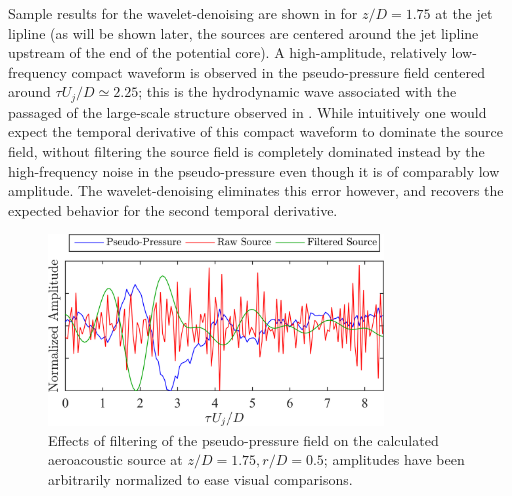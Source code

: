 
Sample results for the wavelet-denoising are shown in  for $z/D=1.75$ at the jet lipline (as will be shown later, the sources are centered around the jet lipline upstream of the end of the potential core).
A high-amplitude, relatively low-frequency compact waveform is observed in the pseudo-pressure field centered around $\tau U_j /D \simeq 2.25$; this is the hydrodynamic wave associated with the passaged of the large-scale structure observed in .
While intuitively one would expect the temporal derivative of this compact waveform to dominate the source field, without filtering the source field is completely dominated instead by the high-frequency noise in the pseudo-pressure even though it is of comparably low amplitude.
The wavelet-denoising eliminates this error however, and recovers the expected behavior for the second temporal derivative.
\begin{figure}
	\centering
	\includegraphics[width = 3.5in]{Figures/ch5_valid_denoising.png}
	\caption{Effects of filtering of the pseudo-pressure field on the calculated aeroacoustic source at $z/D = 1.75, r/D = 0.5$; amplitudes have been arbitrarily normalized to ease visual comparisons.}
	\label{fig:valid_denoising}
\end{figure}

